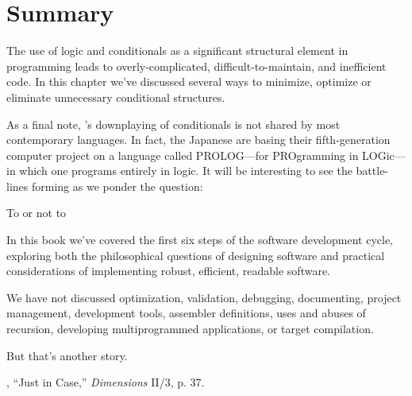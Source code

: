 \section{Summary}

The use of logic and conditionals as a significant structural element in
programming leads to overly-complicated, difficult-to-maintain, and
inefficient code. In this chapter we've discussed several ways to minimize,
optimize or eliminate unnecessary conditional structures.

As a final note, \Forth{}'s downplaying of conditionals is not shared
by most contemporary languages. In fact, the Japanese are basing their
fifth-generation computer project on a language called PROLOG---for
PROgramming in LOGic---in which one programs entirely in logic. It will
be interesting to see the battle-lines forming as we ponder the question:

\begin{tfquot}
To  or not to 
\end{tfquot}
In this book we've covered the first six steps of the software development
cycle, exploring both the philosophical questions of designing software
and practical considerations of implementing robust, efficient, readable
software.

We have not discussed optimization, validation, debugging, documenting,
project management, \Forth{} development tools, assembler
definitions, uses and abuses of recursion, developing multiprogrammed
applications, or target compilation.

But that's another story.

\begin{references}{9}
 , ``Just in Case,'' \emph{\Forth{}
Dimensions} II/3, p. 37.
\end{references}

